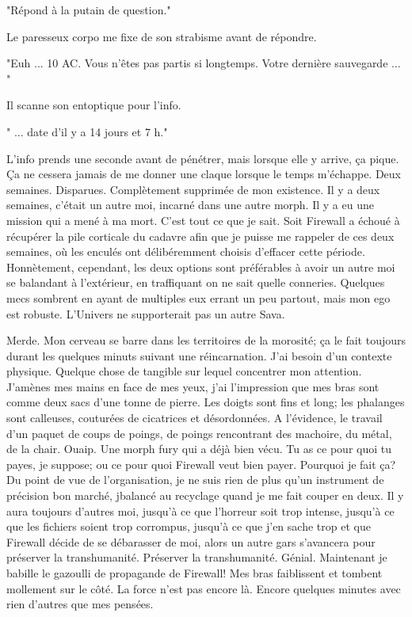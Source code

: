 "Répond à la putain de question." 

Le paresseux corpo me fixe de son strabisme  avant de répondre. 

"Euh ... 10 AC. Vous n'êtes pas partis si longtemps. Votre dernière sauvegarde ... " 

Il scanne son entoptique pour l'info. 

" ... date d'il y a 14 jours et 7 h." 

L'info prends une seconde avant de pénétrer, mais lorsque elle y arrive, ça pique. Ça ne cessera jamais de me donner une claque lorsque le temps m'échappe. Deux semaines. Disparues. Complètement supprimée de mon existence. Il y a deux semaines, c'était un autre moi, incarné dans une autre morph. Il y a eu une mission qui a mené à ma mort. C'est tout ce que je sait. Soit Firewall a échoué à récupérer la pile corticale du cadavre afin que je puisse me rappeler de ces deux semaines, où les enculés ont délibéremment choisis d'effacer cette période. Honnètement, cependant, les deux options sont préférables à avoir un autre moi se balandant à l'extérieur, en traffiquant on ne sait quelle conneries. Quelques mecs sombrent en ayant de multiples eux errant un peu partout, mais mon ego est robuste. L'Univers ne supporterait pas un autre Sava. 

Merde. Mon cerveau se barre dans les territoires de la morosité; ça le fait toujours durant les quelques minuts suivant une réincarnation. J'ai besoin d'un contexte physique. Quelque chose de tangible sur lequel concentrer mon attention. J'amènes mes mains en face de mes yeux, j'ai l'impression que mes bras sont comme deux sacs d'une tonne de pierre. Les doigts sont fins et long; les phalanges sont calleuses, couturées de cicatrices et désordonnées. A l'évidence, le travail d'un paquet de coups de poings, de poings rencontrant des machoire, du métal, de la chair. Ouaip. Une morph fury qui a déjà bien vécu. Tu as ce pour quoi tu payes, je suppose; ou ce pour quoi Firewall veut bien payer. Pourquoi je fait ça? Du point de vue de l'organisation, je ne suis rien de plus qu'un instrument de précision bon marché, jbalancé au recyclage quand je me fait couper en deux. Il y aura toujours d'autres moi, jusqu'à ce que l'horreur soit trop intense, jusqu'à ce que les fichiers soient trop corrompus, jusqu'à ce que j'en sache trop et que Firewall décide de se débarasser de moi, alors un autre gars s'avancera pour préserver la transhumanité. Préserver la transhumanité. Génial. Maintenant je babille le gazoulli de propagande de Firewall! Mes bras faiblissent et tombent mollement sur le côté. La force n'est pas encore là. Encore quelques minutes avec rien d'autres que mes pensées. 

